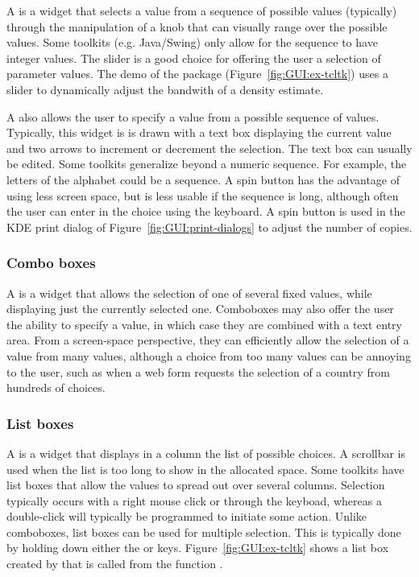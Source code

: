 A  is a widget that selects a value from a
sequence of possible values (typically) through the manipulation of a
knob that can visually range over the possible values. Some toolkits
(e.g. Java/Swing) only allow for the sequence to have integer values. The
slider is a good choice for offering the user a selection of parameter
values. The  demo of the  package
(Figure~\ref{fig:GUI:ex-tcltk}) uses a slider to dynamically adjust the
bandwith of a density estimate.


A  also allows the user to specify a value from a
possible sequence of values. Typically, this widget is is drawn with a
text box displaying the current value and two arrows to increment or
decrement the selection. The text box can usually be edited. Some
toolkits generalize beyond a numeric sequence. For example, the
letters of the alphabet could be a sequence. A spin button has the
advantage of using less screen space, but is less usable if the
sequence is long, although often the user can enter in the choice
using the keyboard. A spin button is used in the KDE print dialog of
Figure~\ref{fig:GUI:print-dialogs} to adjust the number of copies.


\subsubsection{Combo boxes}
\label{sec:GUI:combo-boxes}

A  is a widget that allows the selection of one of
several fixed values, while displaying just the currently selected
one. Comboboxes may also offer the user the ability to specify a
value, in which case they are combined with a text entry area.  From a
screen-space perspective, they can efficiently allow the selection of
a value from many values, although a choice from too many values can
be annoying to the user, such as when a web form requests the
selection of a country from hundreds of choices.

\subsubsection{List boxes}

A  is a widget that displays in a column the list of
possible choices. A scrollbar is used when the list is too long to
show in the allocated space. Some toolkits have list boxes that allow
the values to spread out over several columns. Selection typically
occurs with a right mouse click or through the keyboad, whereas a
double-click will typically be programmed to initiate some
action. Unlike comboboxes, list boxes can be used for multiple
selection. This is typically done by holding down either the
 or  keys. Figure~\ref{fig:GUI:ex-tcltk} shows a
list box created by \R\/ that is called from the function
.


